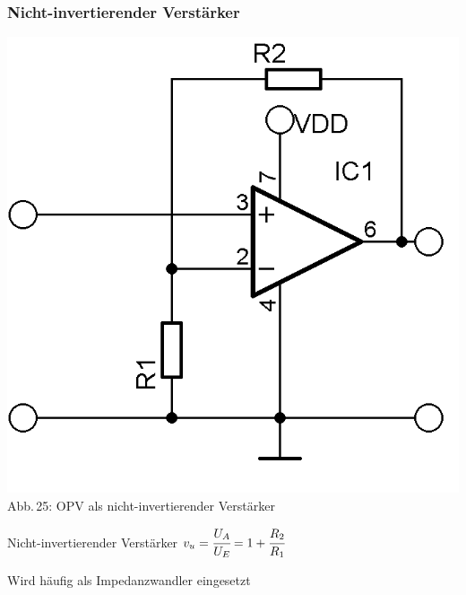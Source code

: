 \begin{frame}
  \frametitle{Nicht-invertierender Verstärker}
  \begin{minipage}{0.4\textwidth}
    \begin{center}
      \includegraphics[width=\textwidth,height=.85\textheight,keepaspectratio]{a06/OPV-nonInverter.png}\\
      {\tiny Abb.\,25: OPV als nicht-invertierender Verstärker}
    \end{center}
  \end{minipage}
  \hspace{2pc}
  \begin{minipage}{0.5\textwidth}
    \centering
    \begin{block}{Nicht-invertierender Verstärker}
      $v_u = \cfrac{U_A}{U_E} = 1+\cfrac{R_2}{R_1}$
    \end{block}
    Wird häufig als Impedanzwandler eingesetzt
  \end{minipage}
\end{frame}

